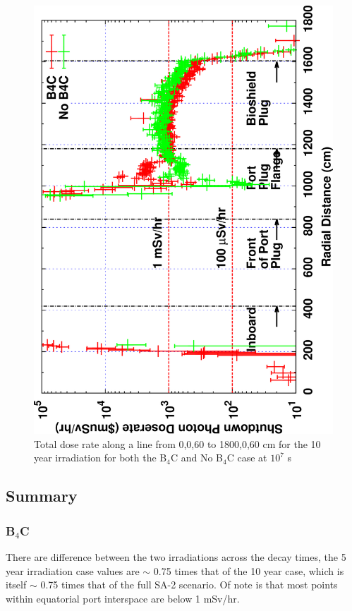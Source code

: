 \documentclass[12pt]{article}
\begin{document}
\begin{figure}[ht!]
\centering
\includegraphics[clip,scale=0.12,angle=-90]{../plots/photon_lineout/comp/10yr_dc3.png}
\caption{Total dose rate along a line from 0,0,60 to 1800,0,60 cm for the 10 year irradiation
for both the B$_4$C and No B$_4$C case at $10^7$ s}
\label{fig:photons_10y_dc3_dose}
\end{figure}
\clearpage
\newpage
\subsection{Summary}
\subsubsection*{B$_4$C}
There are difference between the two irradiations across the decay times, 
the 5 year irradiation case values are $\sim$ 0.75 times that of the 10 year 
case, which is itself $\sim$ 0.75 times that of the full SA-2 scenario. Of note
is that most points within equatorial port interspace are below 1 mSv/hr.
\end{document}
